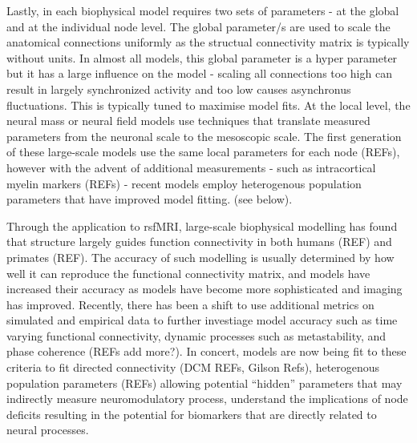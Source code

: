 \documentclass[oneside]{zHenriquesLab-StyleBioRxiv}
\begin{document}
Lastly, in each biophysical model requires two sets of parameters - at the global and at the individual node level. The global parameter/s are used to scale the anatomical connections uniformly as the structual connectivity matrix is typically without units. In almost all models, this global parameter is a hyper parameter but it has a large influence on the model - scaling all connections too high can result in largely synchronized activity and too low causes asynchronus fluctuations. This is typically tuned to maximise model fits. At the local level, the neural mass or neural field models use techniques that translate measured parameters from the neuronal scale to the mesoscopic scale. The first generation of these large-scale models use the same local parameters for each node (REFs), however with the advent of additional measurements - such as intracortical myelin markers (REFs) - recent models employ heterogenous population parameters that have improved model fitting. (see below).


Through the application to rsfMRI, large-scale biophysical modelling has found that structure largely guides function connectivity in both humans (REF) and primates (REF). The accuracy of such modelling is usually determined by how well it can reproduce the functional connectivity matrix, and models have increased their accuracy as models have become more sophisticated and imaging has improved. Recently, there has been a shift to use additional metrics on simulated and empirical data to further investiage model accuracy such as time varying functional connectivity, dynamic processes such as metastability, and phase coherence (REFs add more?). In concert, models are now being fit to these criteria to fit directed connectivity (DCM REFs, Gilson Refs), heterogenous population parameters (REFs) allowing potential ``hidden'' parameters that may indirectly measure neuromodulatory process, understand the implications of node deficits resulting in the potential for biomarkers that are directly related to neural processes. 





\end{document}
